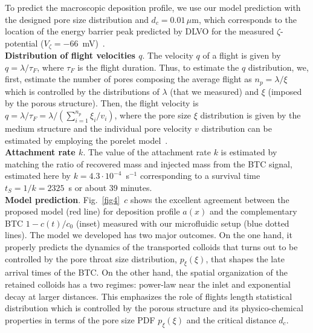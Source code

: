 \documentclass[singlecolumn,pre,notitlepage,preprintnumbers,floatfix,superscriptaddress]{revtex4-1}
\begin{document}
\noindent
To predict the macroscopic deposition profile, we use our model prediction with the designed pore size distribution and $d_c = 0.01 \, \mu$m, which corresponds to the location of the energy barrier peak predicted by DLVO for the measured $\zeta$-potential ($V_\zeta = - 66$~mV)~\cite{kirby_zeta_2004,yu_evaporative_2017}.\\

\noindent
\textbf{Distribution of flight velocities $q$}. The velocity $q$ of a flight is given by $q = \lambda / \tau_F$, where $\tau_F$ is the flight duration. Thus, to estimate the $q$ distribution, we, first, estimate the number of pores composing the average flight as $n_p = \lambda / \xi$ which is controlled by the distributions of $\lambda$ (that we measured) and $\xi$ (imposed by the porous structure). Then, the flight velocity is $q = \lambda / \tau_F = \lambda / (\sum_{i=1}^{n_p} \xi_i / v_i)$, where the pore size $\xi$ distribution is given by the medium structure and the individual pore velocity $v$ distribution can be estimated by employing the porelet model~\cite{deAnnaPRF2017}.\\

\noindent
\textbf{Attachment rate $k$}.
The value of the attachment rate $k$ is estimated by matching the ratio of recovered mass and injected mass from the BTC signal, estimated here by $k = 4.3 \cdot 10^{-4}$~s$^{-1}$ corresponding to a survival time $t_S = 1 / k = 2325$~s or about 39 minutes.\\

\noindent
\textbf{Model prediction}. Fig.~\ref{fig4}~$c$ shows the excellent agreement between the proposed model (red line) for deposition profile $a(x)$ and the complementary BTC $1-c(t)/c_0$ (inset) measured with our microfluidic setup (blue dotted lines). The model we developed has two major outcomes. On the one hand, it properly predicts the dynamics of the transported colloids that turns out to be controlled by the pore throat size distribution, $p_\xi(\xi)$, that shapes the late arrival times of the BTC. On the other hand, the spatial organization of the retained colloids has a two regimes: power-law near the inlet and exponential decay at larger distances. This emphasizes the role of flights length statistical distribution which is  controlled by the porous structure and its physico-chemical properties in terms of the pore size PDF $p_\xi(\xi)$ and the critical distance $d_c$.
\end{document}
